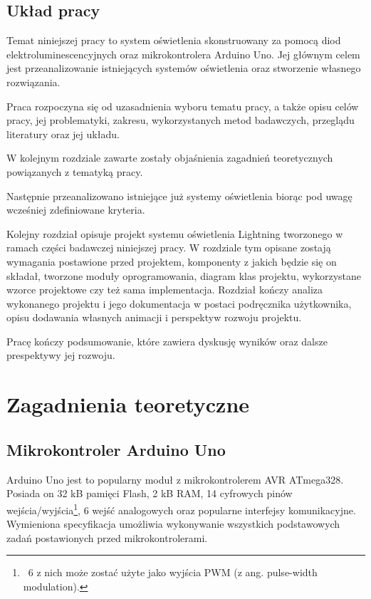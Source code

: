 \documentclass[12pt]{report}
\begin{document}
\section{Układ pracy}

Temat niniejszej pracy to system oświetlenia skonstruowany za pomocą diod elektroluminescencyjnych oraz mikrokontrolera Arduino Uno. Jej głównym celem jest przeanalizowanie istniejących systemów oświetlenia oraz stworzenie własnego ro\-związania.

Praca rozpoczyna się od uzasadnienia wyboru tematu pracy, a także opisu celów pracy, jej problematyki, zakresu, wykorzystanych metod badawczych, przeglądu literatury oraz jej układu.

W kolejnym rozdziale zawarte zostały objaśnienia zagadnień teoretycznych po\-wiązanych z tematyką pracy.

Następnie przeanalizowano istniejące już systemy oświetlenia biorąc pod uwagę wcześniej zdefiniowane kryteria.

Kolejny rozdział opisuje projekt systemu oświetlenia Lightning tworzonego w ramach części badawczej niniejszej pracy. W rozdziale tym opisane zostają wymagania postawione przed projektem, komponenty z jakich będzie się on składał, tworzone moduły oprogramowania, diagram klas projektu, wykorzystane wzorce projektowe czy też sama implementacja. Rozdział kończy analiza wykonanego projektu i jego dokumentacja w postaci podręcznika użytkownika, opisu dodawania własnych animacji i perspektyw rozwoju projektu.

Pracę kończy podsumowanie, które zawiera dyskusję wyników oraz dalsze prespektywy jej rozwoju.

\chapter[Zagadnienia teoretyczne]{Zagadnienia teoretyczne}

\section{Mikrokontroler Arduino Uno}

Arduino Uno jest to popularny moduł z mikrokontrolerem AVR ATmega328. Posiada on 32 kB pamięci Flash, 2 kB RAM, 14 cyfrowych pinów wejścia/wyjścia\footnote{~6 z nich może zostać użyte jako wyjścia PWM (z ang. pulse-width modulation).}, 6 wejść analogowych oraz popularne interfejsy komunikacyjne. Wymieniona specyfikacja umożliwia wykonywanie wszystkich podstawowych zadań postawionych przed mikrokontrolerami.
\end{document}
